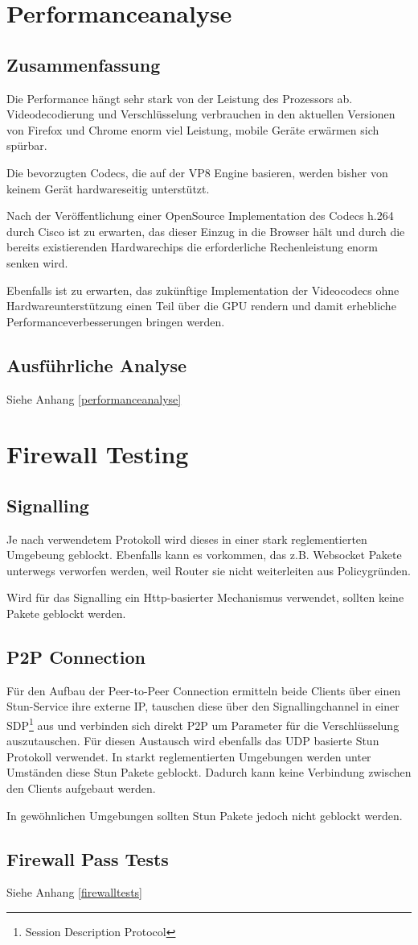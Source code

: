 \chapter{Performanceanalyse}
	\section{Zusammenfassung}
		Die Performance hängt sehr stark von der Leistung des Prozessors ab. Videodecodierung und Verschlüsselung verbrauchen in den aktuellen Versionen von Firefox und Chrome enorm viel Leistung, mobile Geräte erwärmen sich spürbar.
		
		Die bevorzugten Codecs, die auf der VP8 Engine basieren, werden bisher von keinem Gerät hardwareseitig unterstützt.
		
		Nach der Veröffentlichung einer OpenSource Implementation des Codecs h.264 durch Cisco ist zu erwarten, das dieser Einzug in die Browser hält und durch die bereits existierenden Hardwarechips die erforderliche Rechenleistung enorm senken wird.
		
		Ebenfalls ist zu erwarten, das zukünftige Implementation der Videocodecs ohne Hardwareunterstützung einen Teil über die GPU rendern und damit erhebliche Performanceverbesserungen bringen werden.
		
	\section{Ausführliche Analyse}
		Siehe Anhang \ref{performanceanalyse}
	
	
\chapter{Firewall Testing}
	\section{Signalling}
		Je nach verwendetem Protokoll wird dieses in einer stark reglementierten Umgebeung geblockt. Ebenfalls kann es vorkommen, das z.B. Websocket Pakete unterwegs verworfen werden, weil Router sie nicht weiterleiten aus Policygründen.
		
		Wird für das Signalling ein Http-basierter Mechanismus verwendet, sollten keine Pakete geblockt werden.

	\section{P2P Connection}
		Für den Aufbau der Peer-to-Peer Connection ermitteln beide Clients über einen Stun-Service ihre externe IP, tauschen diese über den Signallingchannel in einer SDP\footnote{Session Description Protocol} aus und verbinden sich direkt P2P um Parameter für die Verschlüsselung auszutauschen. Für diesen Austausch wird ebenfalls das UDP basierte Stun Protokoll verwendet. 
		In starkt reglementierten Umgebungen werden unter Umständen diese Stun Pakete geblockt. Dadurch kann keine Verbindung zwischen den Clients aufgebaut werden.
		
		In gewöhnlichen Umgebungen sollten Stun Pakete jedoch nicht geblockt werden.
	
	\section{Firewall Pass Tests}
		Siehe Anhang \ref{firewalltests}